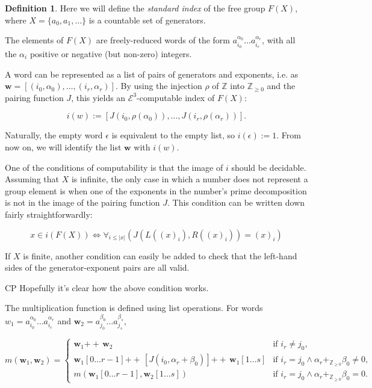\documentclass[a4paper]{article}
\newcommand{\grz}[1]{$\mathcal{E}^{#1}$}	%
\newcommand{\ZZ}{\mathbb{Z}}
\newcommand{\Zpos}{\mathbb{Z}_{\geq 0}}
\newcommand{\wvec}{\mathbf{w}}	%
\newcommand{\concat}{\ensuremath{+\!\!\!\!+\,}}	%
\theoremstyle{plain}
\theoremstyle{definition}
\newtheorem{definition}[theorem]{Definition}
\newenvironment{cpe}{\noindent\color{OliveGreen} CP }{}
\newcommand{\cp}[1]{
\begin{cpe} #1 \end{cpe}}
\begin{document}
\begin{definition} \label{freegroupindex}
	Here we will define the {\it standard index} of the free group $F(X)$, where $X = \{ a_0, a_1, \dots \}$ is a countable set of generators.

The elements of $F(X)$ are freely-reduced words of the form $a_{i_0}^{\alpha_0} \dots a_{i_r}^{\alpha_r}$, with all the $\alpha_i$ positive or negative (but non-zero) integers. 

A word can be represented as a list of pairs of generators and exponents, i.e. as $\wvec = [(i_0,\alpha_0), \dots, (i_r, \alpha_r)]$. By using the injection $\rho$ of $\ZZ$ into $\Zpos$ and the pairing function $J$, this yields an \grz{3}-computable index of $F(X)$:

\[ i(w) := [J(i_0,\rho(\alpha_0)), \dots, J(i_r,\rho(\alpha_r))]. \]

Naturally, the empty word $\epsilon$ is equivalent to the empty list, so $i(\epsilon) := 1$.
From now on, we will identify the list $\wvec$ with $i(w)$.

One of the conditions of computability is that the image of $i$ should be decidable. Assuming that $X$ is infinite, the only case in which a number does not represent a group element is when one of the exponents in the number's prime decomposition is not in the image of the pairing function $J$.
This condition can be written down fairly straightforwardly:

\[x \in i(F(X)) \Leftrightarrow \forall_{i \leq |x|} \left( J(L((x)_i),R((x)_i)) = (x)_i \right) \]

If $X$ is finite, another condition can easily be added to check that the left-hand sides of the generator-exponent pairs are all valid.

\cp{ Hopefully it's clear how the above condition works. }

The multiplication function is defined using list operations. 
For words $w_1 = a_{i_0}^{\alpha_0} \dots a_{i_r}^{\alpha_r}$ and $\wvec_2 = a_{j_0}^{\beta_0} \dots a_{j_s}^{\beta_s}$,

\[ m(\wvec_1, \wvec_2) = \begin{cases}
		\wvec_1 \concat \wvec_2 & \textrm{if } i_r \neq j_0, \\
		\wvec_1[0 \dots r-1] \concat [J(i_0, \alpha_r + \beta_0)] \concat \wvec_1[1 \dots s] & \textrm{if } i_r = j_0 \wedge \alpha_r +_{\Zpos} \beta_0 \neq 0, \\
		m( \wvec_1[0 \dots r-1], \wvec_2[1 \dots s]) & \textrm{if } i_r = j_0 \wedge \alpha_r +_{\Zpos} \beta_0 = 0.
	\end{cases}
\]


\end{definition}
\end{document}
